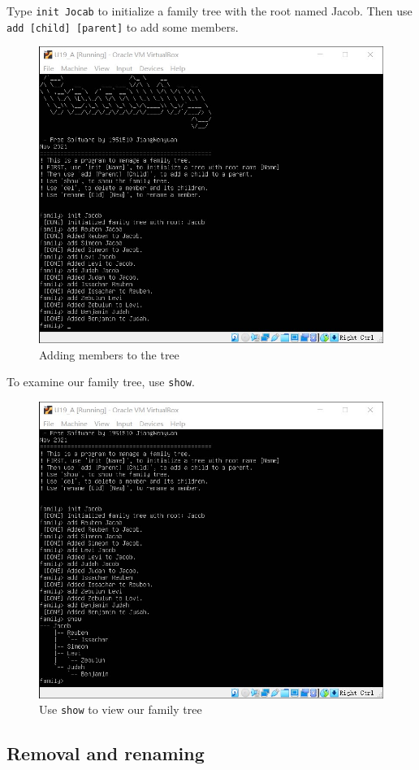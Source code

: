\documentclass[cn,black,12pt,normal]{elegantnote}
\begin{document}
Type \lstinline{init Jocab} to initialize a family tree with the root named Jacob. Then use \lstinline{add [child] [parent]} to add some members.

\begin{figure}[H]
    \centering
    \includegraphics[width=0.7\linewidth]{image/f02.jpg}
    \caption{Adding members to the tree}
\end{figure}

To examine our family tree, use \lstinline{show}.

\begin{figure}[H]
    \centering
    \includegraphics[width=0.7\linewidth]{image/f03.jpg}
    \caption{Use \lstinline{show} to view our family tree}
\end{figure}

\subsection{Removal and renaming}
\end{document}
